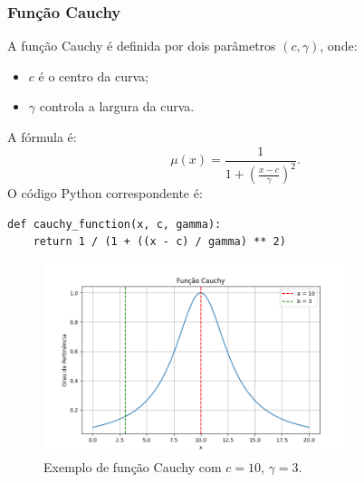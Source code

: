 \documentclass[a4paper,12pt]{article}
\begin{document}
\subsubsection{Função Cauchy}
A função Cauchy é definida por dois parâmetros $(c, \gamma)$, onde:
\begin{itemize}
    \item $c$ é o centro da curva;
    \item $\gamma$ controla a largura da curva.
\end{itemize}
A fórmula é:
\[
\mu(x) = \frac{1}{1 + \left(\frac{x - c}{\gamma}\right)^2}.
\]
O código Python correspondente é:
\begin{verbatim}
def cauchy_function(x, c, gamma):
    return 1 / (1 + ((x - c) / gamma) ** 2)
\end{verbatim}
\begin{figure}[H]
    \centering
    \includegraphics[width=0.8\textwidth]{img/cauchy.png}
    \caption{Exemplo de função Cauchy com $c=10$, $\gamma=3$.}
\end{figure}
\end{document}
